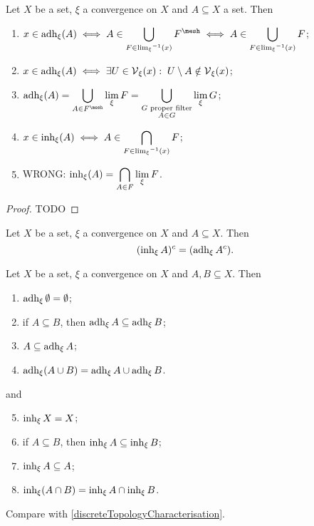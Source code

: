 \begin{proposition} \label{adherenceInherenceCharacterisation}
Let $X$ be a set, $\xi$ a convergence on $X$ and $A \subseteq X$ a set. Then
\begin{enumerate}
\item $\displaystyle x\in \adh_\xi(A) \iff A \in \bigcup_{F\in {\lim_\xi}^{-1}(x)} F^{\mesh} \iff A \in \bigcup_{F\in {\lim_\xi}^{-1}(x)} F$;
\item $x\in \operatorname{adh}_\xi(A) \iff \exists U\in \operatorname{\mathcal{V}}_\xi(x): \; U\setminus A \notin \operatorname{\mathcal{V}}_\xi(x)$;
\item $\displaystyle \adh_\xi(A) = \bigcup_{A \in F^{\mesh}}\lim_\xi F = \bigcup_{\substack{\text{$G$ proper filter} \\ A\in G}} \lim_\xi G$;
\item $\displaystyle x\in \operatorname{inh}_\xi(A) \iff A \in \bigcap_{F\in {\lim_\xi}^{-1}(x)} F$;
\item WRONG: $\displaystyle \operatorname{inh}_\xi(A) = \bigcap_{A \in F}\lim_\xi F$.
\end{enumerate}
\end{proposition}
\begin{proof}
TODO
\end{proof}
\begin{corollary} \label{inherenceComplementAdherence}
Let $X$ be a set, $\xi$ a convergence on $X$ and $A \subseteq X$. Then
\[ (\operatorname{inh}_\xi A)^c = (\operatorname{adh}_\xi A^c). \]
\end{corollary}
\begin{corollary} \label{inherenceAdherenceProperties}
Let $X$ be a set, $\xi$ a convergence on $X$ and $A,B \subseteq X$. Then
\begin{enumerate}
\item $\operatorname{adh}_\xi \emptyset = \emptyset$;
\item if $A \subseteq B$, then $\operatorname{adh}_\xi A \subseteq \operatorname{adh}_\xi B$;
\item $A\subseteq \operatorname{adh}_\xi A$;
\item $\operatorname{adh}_\xi(A\cup B) = \operatorname{adh}_\xi A \cup \operatorname{adh}_\xi B$.
\end{enumerate}
and
\begin{enumerate} \setcounter{enumi}{4}
\item $\operatorname{inh}_\xi X = X$;
\item if $A \subseteq B$, then $\operatorname{inh}_\xi A \subseteq \operatorname{inh}_\xi B$;
\item $\operatorname{inh}_\xi A \subseteq A$;
\item $\operatorname{inh}_\xi(A\cap B) = \operatorname{inh}_\xi A \cap \operatorname{inh}_\xi B$.
\end{enumerate}
\end{corollary}
Compare with \ref{discreteTopologyCharacterisation}.

